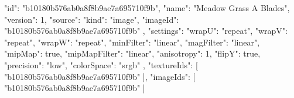 {
  "id": "b10180b576ab0a8f8b9ae7a695710f9b",
  "name": "Meadow Grass A Blades",
  "version": 1,
  "source": {
    "kind": "image",
    "imageId": "b10180b576ab0a8f8b9ae7a695710f9b"
  },
  "settings": {
    "wrapU": "repeat",
    "wrapV": "repeat",
    "wrapW": "repeat",
    "minFilter": "linear",
    "magFilter": "linear",
    "mipMap": true,
    "mipMapFilter": "linear",
    "anisotropy": 1,
    "flipY": true,
    "precision": "low",
    "colorSpace": "srgb"
  },
  "textureIds": [
    "b10180b576ab0a8f8b9ae7a695710f9b"
  ],
  "imageIds": [
    "b10180b576ab0a8f8b9ae7a695710f9b"
  ]
}
